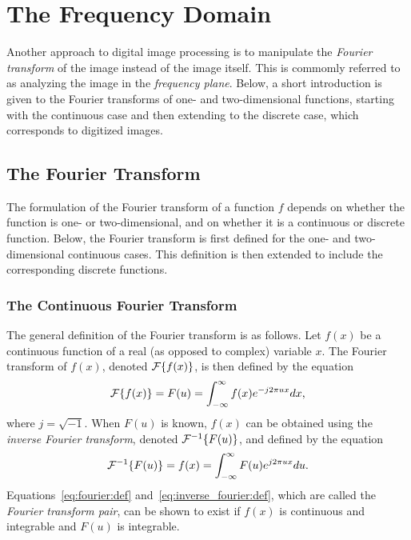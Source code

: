 
\section{The Frequency Domain}
\label{image:frequency}

Another approach to digital image processing is to manipulate the {\em
  Fourier transform\/} of the image instead of the image itself.  This
is commomly referred to as analyzing the image in the {\em frequency
  plane\/}.  Below, a short introduction is given to the Fourier
transforms of one- and two-dimensional functions, starting with the
continuous case and then extending to the discrete case, which
corresponds to digitized images.

\subsection{The Fourier Transform}
\label{image:frequency:fourier}

The formulation of the Fourier transform of a function $f$ depends on
whether the function is one- or two-dimensional, and on whether it is
a continuous or discrete function.  Below, the Fourier transform is
first defined for the one- and two-dimensional continuous cases.  This
definition is then extended to include the corresponding discrete
functions.

\subsubsection{The Continuous Fourier Transform}

The general definition of the Fourier transform is as follows.  Let
$f(x)$ be a continuous function of a real (as opposed to complex)
variable $x$.  The Fourier transform of $f(x)$, denoted ${\cal
  F}\{f(x)\}$, is then defined by the equation
\begin{equation}
\label{eq:fourier:def}
  {\cal F}\{f(x)\}=F(u)=\int_{-\infty}^{\infty}f(x)e^{-j2\pi
    ux}dx\mbox{,} 
\end{equation}
where $j=\sqrt{-1}$.  When $F(u)$ is known, $f(x)$ can be obtained
using the {\em inverse Fourier transform\/}, denoted ${\cal
  F}^{-1}\{F(u)\}$, and defined by the equation
\begin{equation}
\label{eq:inverse_fourier:def}
  {\cal F}^{-1}\{F(u)\}=f(x)=\int_{-\infty}^{\infty}F(u)e^{j2\pi
    ux}du\mbox{.}
\end{equation}
Equations~\ref{eq:fourier:def} and~\ref{eq:inverse_fourier:def}, which
are called the {\em Fourier transform pair\/}, can be shown to exist
if $f(x)$ is continuous and integrable and $F(u)$ is integrable.

